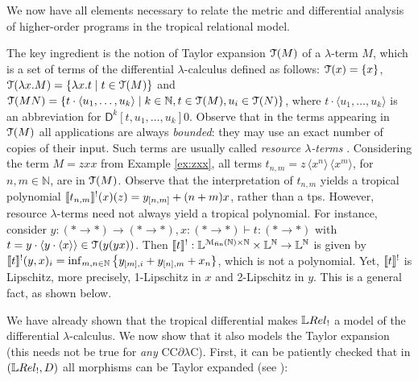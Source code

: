 

We now have all elements necessary to relate the metric and differential analysis of higher-order programs in the tropical relational model. 

The key ingredient is the notion of Taylor expansion $\mathcal{T}(M)$ of a $\lambda$-term $M$, which is a set of terms of the differential $\lambda$-calculus defined as follows:
%
%
%
%
%
%
%
%
$\mathcal{T}(x)=\{x\}$, $\mathcal{T}(\lambda x.M)=\{\lambda x.t\mid t\in \mathcal{T}(M)\}$ and 
$\mathcal{T}(MN)=\{t\cdot \langle u_{1},\dots, u_{k}\rangle  \mid k\in \mathbb N, t\in \mathcal{T}(M), u_{i}\in \mathcal{T}(N) \}$, where $t\cdot \langle u_{1},\dots, u_{k}\rangle$ is an abbreviation for $\mathsf D^{k}[t, u_{1},\dots, u_{k}] 0$. 
Observe that in the terms appearing in $\mathcal{T}(M)$ all applications are always \emph{bounded}: they may use an exact number of copies of their input. 
Such terms are usually called \emph{resource $\lambda$-terms} \cite{Pagani2009, Manzo2012}.
Considering the term $M=zxx$ from Example \ref{ex:zxx}, all terms
 $t_{n,m}=z \,\langle x^{n}\rangle\,\langle x^{m}\rangle$, for $n,m\in \mathbb N$, are in $\mathcal{T}(M)$. 
Observe that the interpretation of $t_{n,m}$ yields a tropical polynomial
$\llbracket t_{n,m}\rrbracket^{!}(x)(z)= y_{[n,m]}+(n+m)x$, rather than a tps. 
However, resource $\lambda$-terms need not always yield a tropical polynomial. For instance, consider $y:(*\to*)\to (*\to*), x:(*\to *) \vdash t:  (*\to  *)$
with $t=y\cdot \langle y\cdot \langle x\rangle \rangle\in \mathcal{T}(y(yx))$. Then 
$\llbracket t\rrbracket^{!}: \mathbb{L}^{  \mathcal M_{\mathrm{fin}}(\mathbb N)\times \mathbb N}
\times \mathbb{L}^{\mathbb N} \to \mathbb{L}^{\mathbb N}$ is given by
$
\llbracket t\rrbracket^{!}(y,x)_{i}= \inf_{m,n\in \mathbb N}\big\{    y_{[m],i}  +  y_{[n],m}+  x_{n}\}
$, 
which is not a polynomial. Yet, $\llbracket t\rrbracket^{!}$ is Lipschitz, more precisely, 1-Lipschitz in $x$ and 2-Lipschitz in $y$. This is a general fact, as shown below.

%
We have already shown that the tropical differential makes $\LREL_{!}$ a model of the differential $\lambda$-calculus. We now show that it also models the Taylor expansion (this needs not be true for \emph{any} CC$\partial\lambda$C).
First, it can be patiently checked that in $(\LREL_!,D)$ all morphisms can be Taylor expanded  (see \cite[Definition 4.22]{Manzo2012}):

